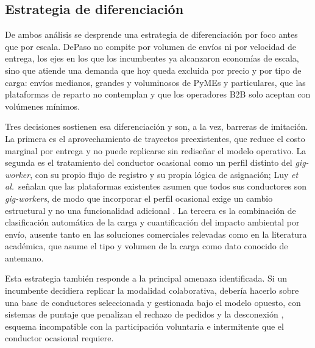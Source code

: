 {%
\subsection{Estrategia de diferenciación}

De ambos análisis se desprende una estrategia de diferenciación por foco antes que por escala. DePaso no compite por volumen de envíos ni por velocidad de entrega, los ejes en los que los incumbentes ya alcanzaron economías de escala, sino que atiende una demanda que hoy queda excluida por precio y por tipo de carga: envíos medianos, grandes y voluminosos de PyMEs y particulares, que las plataformas de reparto no contemplan y que los operadores B2B solo aceptan con volúmenes mínimos.

Tres decisiones sostienen esa diferenciación y son, a la vez, barreras de imitación. La primera es el aprovechamiento de trayectos preexistentes, que reduce el costo marginal por entrega \parencite{YangEtAl2022} y no puede replicarse sin rediseñar el modelo operativo. La segunda es el tratamiento del conductor ocasional como un perfil distinto del \emph{gig-worker}, con su propio flujo de registro y su propia lógica de asignación; Luy \textit{et al.}\ señalan que las plataformas existentes asumen que todos sus conductores son \emph{gig-workers}, de modo que incorporar el perfil ocasional exige un cambio estructural y no una funcionalidad adicional \parencite{LuyEtAl2023}. La tercera es la combinación de clasificación automática de la carga y cuantificación del impacto ambiental por envío, ausente tanto en las soluciones comerciales relevadas como en la literatura académica, que asume el tipo y volumen de la carga como dato conocido de antemano.

Esta estrategia también responde a la principal amenaza identificada. Si un incumbente decidiera replicar la modalidad colaborativa, debería hacerlo sobre una base de conductores seleccionada y gestionada bajo el modelo opuesto, con sistemas de puntaje que penalizan el rechazo de pedidos y la desconexión \parencite{OIT2020}, esquema incompatible con la participación voluntaria e intermitente que el conductor ocasional requiere.
}%
